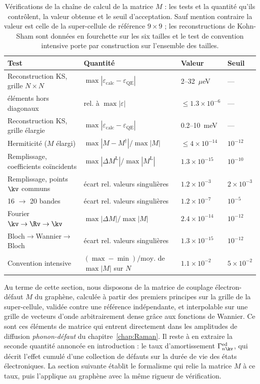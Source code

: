 \begin{table}[htbp]
    \centering
    \small
    \setlength{\tabcolsep}{2pt}
    \caption[Vérifications de la chaîne de calcul de la matrice de
    couplage.]{Vérifications de la chaîne de calcul de la matrice $M$ : les tests et la quantité qu'ils contrôlent, la valeur obtenue et le seuil d'acceptation. Sauf mention contraire la valeur est celle de la super-cellule de référence $9\times9$ ; les reconstructions de Kohn-Sham sont données en fourchette sur les six tailles et le test de convention intensive porte par construction sur l'ensemble des tailles.}
    \label{tab:tests_M}
    \begin{tabular}{l l l l}
        \hline\hline
        Test & Quantité & Valeur & Seuil \\
        \hline
        Reconstruction KS, grille $N\times N$ & $\max|\varepsilon_\text{calc}-\varepsilon_\text{QE}|$ & 2--32~$\mu$eV & --- \\
        \quad éléments hors diagonaux & rel. à $\max|\varepsilon|$ & $\le 1.3\times10^{-6}$ & --- \\
        Reconstruction KS, grille élargie & $\max|\varepsilon_\text{calc}-\varepsilon_\text{QE}|$ & 0.2--10~meV & --- \\
        Hermiticité ($M$ élargi) & $\max|M-M^\dagger|/\max|M|$ & $\le 4\times10^{-14}$ & $10^{-12}$ \\
        Remplissage, coefficients coïncidents & $\max|\Delta M^\text{L}|/\max|M^\text{L}|$ & $1.3\times10^{-15}$ & $10^{-10}$ \\
        Remplissage, points $\kv$ communs & écart rel. valeurs singulières & $1.2\times10^{-3}$ & $2\times10^{-3}$ \\
        16 $\to$ 20 bandes & écart rel. valeurs singulières & $1.2\times10^{-7}$ & $10^{-5}$ \\
        Fourier $\kv\to\Rv\to\kv$ & $\max|\Delta M|/\max|M|$ & $2.4\times10^{-14}$ & $10^{-12}$ \\
        Bloch$\to$Wannier$\to$Bloch & écart rel. valeurs singulières & $1.3\times10^{-15}$ & $10^{-12}$ \\
        Convention intensive & $(\max-\min)/\text{moy.}$ de $\max|M|$ sur $N$ & $1.1\times10^{-2}$ & $5\times10^{-2}$ \\
        \hline\hline
    \end{tabular}
\end{table}

Au terme de cette section, nous disposons de la matrice de couplage électron-défaut $M$ du graphène, calculée à partir des premiers principes sur la grille de la super-cellule, validée contre une référence indépendante, et interpolable sur une grille de vecteurs d'onde arbitrairement dense grâce aux fonctions de Wannier. Ce sont ces éléments de matrice qui entrent directement dans les amplitudes de diffusion \textit{phonon-défaut} du chapitre~\ref{chap:Raman}. Il reste à en extraire la seconde quantité annoncée en introduction : le taux d'amortissement $\Gamma_{n\kv}^\text{ed}$, qui décrit l'effet cumulé d'une collection de défauts sur la durée de vie des états électroniques. La section suivante établit le formalisme qui relie la matrice $M$ à ce taux, puis l'applique au graphène avec la même rigueur de vérification.

